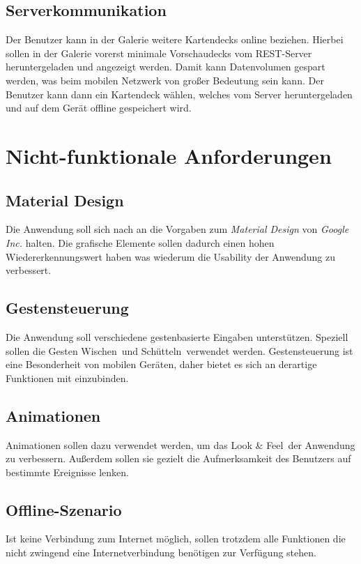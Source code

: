 \subsection{Serverkommunikation}

Der Benutzer kann in der Galerie weitere Kartendecks online beziehen. Hierbei sollen in der Galerie vorerst minimale Vorschaudecks vom REST-Server heruntergeladen und angezeigt werden. Damit kann Datenvolumen gespart werden, was beim mobilen Netzwerk von großer Bedeutung sein kann. Der Benutzer kann dann ein Kartendeck wählen, welches vom Server heruntergeladen und auf dem Gerät offline gespeichert wird.

\section{Nicht-funktionale Anforderungen}
\label{sec:nichtfunktionaleanforderungen}

\subsection{Material Design}

Die Anwendung soll sich nach an die Vorgaben zum \textit{Material Design} von \textit{Google Inc.} halten. Die grafische Elemente sollen dadurch einen hohen Wiedererkennungswert haben was wiederum die Usability der Anwendung zu verbessert.

\subsection{Gestensteuerung}

Die Anwendung soll verschiedene gestenbasierte Eingaben unterstützen. Speziell sollen die Gesten \glqq Wischen\grqq\ und \glqq Schütteln\grqq\ verwendet werden. Gestensteuerung ist eine Besonderheit von mobilen Geräten, daher bietet es sich an derartige Funktionen mit einzubinden.

\subsection{Animationen}

Animationen sollen dazu verwendet werden, um das \glqq Look \& Feel\grqq\ der Anwendung zu verbessern. Außerdem sollen sie gezielt die Aufmerksamkeit des Benutzers auf bestimmte Ereignisse lenken.

\subsection{Offline-Szenario}

Ist keine Verbindung zum Internet möglich, sollen trotzdem alle Funktionen die nicht zwingend eine Internetverbindung benötigen zur Verfügung stehen.